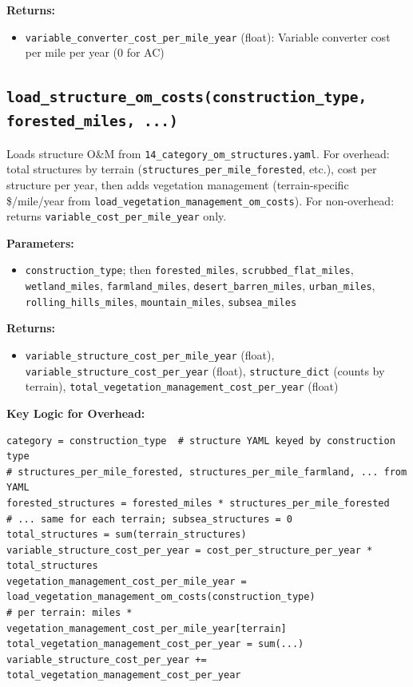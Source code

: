 \documentclass[ctcc_full_documentation.tex]{subfiles}
\begin{document}
\textbf{Returns:}
\begin{itemize}
    \item \texttt{variable\_converter\_cost\_per\_mile\_year} (float): Variable converter cost per mile per year (0 for AC)
\end{itemize}

\subsection{\texttt{load\_structure\_om\_costs(construction\_type, forested\_miles, ...)}}

Loads structure O\&M from \texttt{14\_category\_om\_structures.yaml}. For overhead: total structures by terrain (\texttt{structures\_per\_mile\_forested}, etc.), cost per structure per year, then adds vegetation management (terrain-specific \$/mile/year from \texttt{load\_vegetation\_management\_om\_costs}). For non-overhead: returns \texttt{variable\_cost\_per\_mile\_year} only.

\textbf{Parameters:}
\begin{itemize}
    \item \texttt{construction\_type}; then \texttt{forested\_miles}, \texttt{scrubbed\_flat\_miles}, \texttt{wetland\_miles}, \texttt{farmland\_miles}, \texttt{desert\_barren\_miles}, \texttt{urban\_miles}, \texttt{rolling\_hills\_miles}, \texttt{mountain\_miles}, \texttt{subsea\_miles}
\end{itemize}

\textbf{Returns:}
\begin{itemize}
    \item \texttt{variable\_structure\_cost\_per\_mile\_year} (float), \texttt{variable\_structure\_cost\_per\_year} (float), \texttt{structure\_dict} (counts by terrain), \texttt{total\_vegetation\_management\_cost\_per\_year} (float)
\end{itemize}

\textbf{Key Logic for Overhead:}
\begin{lstlisting}
category = construction_type  # structure YAML keyed by construction type
# structures_per_mile_forested, structures_per_mile_farmland, ... from YAML
forested_structures = forested_miles * structures_per_mile_forested
# ... same for each terrain; subsea_structures = 0
total_structures = sum(terrain_structures)
variable_structure_cost_per_year = cost_per_structure_per_year * total_structures
vegetation_management_cost_per_mile_year = load_vegetation_management_om_costs(construction_type)
# per terrain: miles * vegetation_management_cost_per_mile_year[terrain]
total_vegetation_management_cost_per_year = sum(...)
variable_structure_cost_per_year += total_vegetation_management_cost_per_year
\end{lstlisting}
\end{document}
